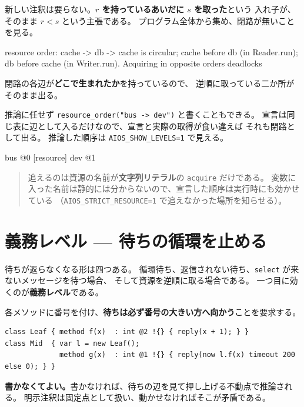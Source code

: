 \documentclass[11pt,a4paper]{ltjsarticle}
\begin{document}
新しい注釈は要らない。\textbf{$r$ を持っているあいだに $s$ を取った}という
入れ子が、そのまま $r < s$ という主張である。
プログラム全体から集め、閉路が無いことを見る。

\begin{term}
resource order: cache -> db -> cache is circular;
  cache before db (in Reader.run); db before cache (in Writer.run).
  Acquiring in opposite orders deadlocks
\end{term}

閉路の各辺が\textbf{どこで生まれたか}を持っているので、
逆順に取っている二か所がそのまま出る。

推論に任せず \texttt{resource\_order("bus -> dev")} と書くこともできる。
宣言は同じ表に辺として入るだけなので、宣言と実際の取得が食い違えば
それも閉路として出る。
推論した順序は \texttt{AIOS\_SHOW\_LEVELS=1} で見える。

\begin{term}
[resource] bus                  @0
[resource] dev                  @1
\end{term}

\begin{quote}\small
追えるのは資源の名前が\textbf{文字列リテラル}の \texttt{acquire} だけである。
変数に入った名前は静的には分からないので、宣言した順序は実行時にも効かせている
（\texttt{AIOS\_STRICT\_RESOURCE=1} で追えなかった場所を知らせる）。
\end{quote}

\section{義務レベル --- 待ちの循環を止める}
\label{sec:levels}

待ちが返らなくなる形は四つある。
循環待ち、返信されない待ち、\texttt{select} が来ないメッセージを待つ場合、
そして資源を逆順に取る場合である。
一つ目に効くのが\textbf{義務レベル}である。

各メソッドに番号を付け、\textbf{待ちは必ず番号の大きい方へ向かう}ことを要求する。

\begin{lstlisting}
class Leaf { method f(x)  : int @2 !{} { reply(x + 1); } }
class Mid  { var l = new Leaf();
             method g(x)  : int @1 !{} { reply(now l.f(x) timeout 200 else 0); } }
\end{lstlisting}

\textbf{書かなくてよい。}書かなければ、待ちの辺を見て押し上げる不動点で推論される。
明示注釈は固定点として扱い、動かせなければそこが矛盾である。
\end{document}
